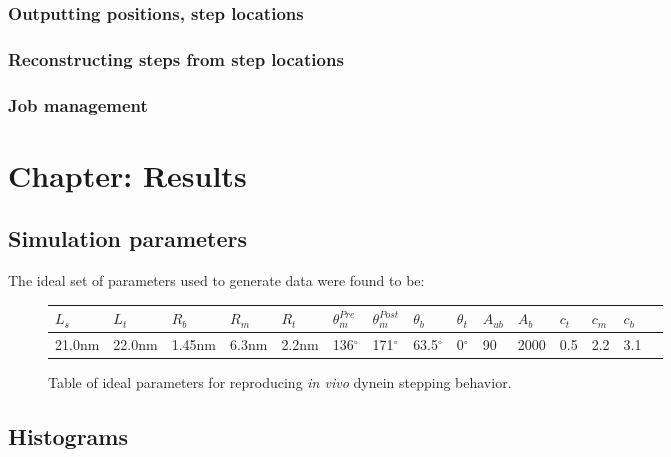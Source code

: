 \documentclass[10pt]{article} %
\begin{document}
\subsubsection{Outputting positions, step locations}
\subsubsection{Reconstructing steps from step locations}
\subsubsection{Job management}

\section{Chapter: Results}

\subsection{Simulation parameters}
The ideal set of parameters used to generate data were found to be:

\begin{figure}[h]
  \centering
  \begin{tabular}{| l | l | l | l | l | l | l | l | l | l | l | l | l | l | l |}
    \hline
    $L_s$ & $L_t$ & $R_b$ & $R_m$ & $R_t$ & $\theta_{m}^{Pre}$ & $\theta_{m}^{Post}$ & $\theta_{b}$ & $\theta_{t}$ & $A_{ub}$ & $A_b$ & $c_t$ & $c_m$  &$c_b$\\ \hline
    21.0nm & 22.0nm & 1.45nm & 6.3nm & 2.2nm & 136$^{\circ}$ & 171$^{\circ}$ & 63.5$^{\circ}$ & 0$^{\circ}$ & 90 & 2000 & 0.5 & 2.2  & 3.1\\ \hline
  \end{tabular}
  \caption{Table of ideal parameters for reproducing \textit{in vivo} dynein stepping behavior.}
  \label{final-parameter-table}
\end{figure}

\subsection{Histograms}

\end{document}
